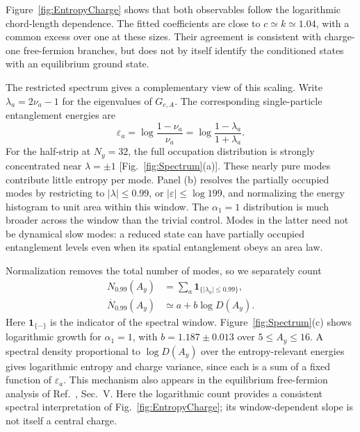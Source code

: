 \documentclass[aps,prb,10pt,twocolumn,superscriptaddress,longbibliography,floatfix]{revtex4-2}
\begin{document}
{\color{blue}
Figure~\ref{fig:EntropyCharge} shows that both observables follow the logarithmic chord-length dependence. The fitted coefficients are close to $c\simeq k\simeq1.04$, with a common excess over one at these sizes. Their agreement is consistent with charge-one free-fermion branches, but does not by itself identify the conditioned states with an equilibrium ground state.

The restricted spectrum gives a complementary view of this scaling. Write $\lambda_a=2\nu_a-1$ for the eigenvalues of $G_{c,A}$. The corresponding single-particle entanglement energies are
\begin{equation}
 \varepsilon_a=\log\frac{1-\nu_a}{\nu_a}
 =\log\frac{1-\lambda_a}{1+\lambda_a}.
 \label{eq:EntanglementEnergies}
\end{equation}
For the half-strip at $N_y=32$, the full occupation distribution is strongly concentrated near $\lambda=\pm1$ [Fig.~\ref{fig:Spectrum}(a)]. These nearly pure modes contribute little entropy per mode. Panel (b) resolves the partially occupied modes by restricting to $|\lambda|\leq0.99$, or $|\varepsilon|\leq\log199$, and normalizing the energy histogram to unit area within this window. The $\alpha_1=1$ distribution is much broader across the window than the trivial control. Modes in the latter need not be dynamical slow modes: a reduced state can have partially occupied entanglement levels even when its spatial entanglement obeys an area law.

Normalization removes the total number of modes, so we separately count
\begin{align}
 N_{0.99}(A_y)&=\sum_a\mathbf1_{\{|\lambda_a|\leq0.99\}},\nonumber\\
 \overline N_{0.99}(A_y)&\simeq a+b\log D(A_y).
 \label{eq:WindowCount}
\end{align}
Here $\mathbf1_{\{\cdots\}}$ is the indicator of the spectral window. Figure~\ref{fig:Spectrum}(c) shows logarithmic growth for $\alpha_1=1$, with $b=1.187\pm0.013$ over $5\leq A_y\leq16$. A spectral density proportional to $\log D(A_y)$ over the entropy-relevant energies gives logarithmic entropy and charge variance, since each is a sum of a fixed function of $\varepsilon_a$. This mechanism also appears in the equilibrium free-fermion analysis of Ref.~\cite{EislerPeschel2010}, Sec.~V. Here the logarithmic count provides a consistent spectral interpretation of Fig.~\ref{fig:EntropyCharge}; its window-dependent slope is not itself a central charge.
}
\end{document}
